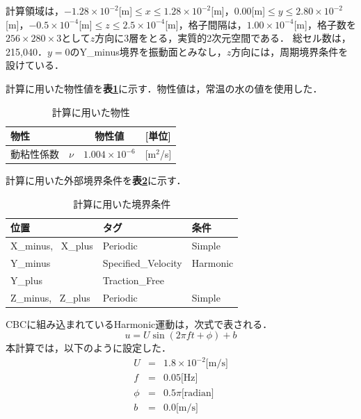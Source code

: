 計算領域は，$-1.28\times 10^{-2}$[m]$\leq x \leq1.28\times 10^{-2}$[m]，$0.00$[m]$\leq y \leq2.80\times 10^{-2}$[m]，$-0.5\times 10^{-4}$[m]$\leq z \leq2.5\times 10^{-4}$[m]，格子間隔は，$1.00\times 10^{-4}$[m]，格子数を$256\times280\times3$として$z$方向に3層をとる，実質的2次元空間である．
総セル数は，215,040．$y=0$のY\_minus境界を振動面とみなし，$z$方向には，周期境界条件を設けている．

計算に用いた物性値を\textbf{表\ref{table:stokes_bussei}}に示す．物性値は，常温の水の値を使用した．

\begin{table}[htbp]
\begin{center}
\caption{計算に用いた物性}
\label{table:stokes_bussei}
\begin{tabular}{lccl}
\toprule
物性	&&物性値 &[単位]\\
\hline
動粘性係数& $\nu$&$1.004\times 10^{-6}$ & [m$^2$/s] \\
\bottomrule
\end{tabular}
\end{center}
\end{table}

計算に用いた外部境界条件を\textbf{表\ref{table:stokes bci}}に示す．

\begin{table}[hdpt]
\caption{計算に用いた境界条件}
\label{table:stokes bci}
\begin{center}
\begin{tabular}{lll}
\toprule
位置&タグ	&条件 	\\
\hline
 X\_minus, \, X\_plus&Periodic & Simple \\
 Y\_minus&Specified\_Velocity & Harmonic \\
 Y\_plus&Traction\_Free &\\
Z\_minus, \, Z\_plus& Periodic & Simple \\
\bottomrule
\end{tabular}
\end{center}
\end{table}

CBCに組み込まれているHarmonic運動は，次式で表される．
\begin{equation}
u=U \sin(2\pi f t + \phi)+b
\end{equation}
本計算では，以下のように設定した．
\begin{eqnarray}
U & = & 1.8\times 10^{-2} \mbox{[m/s]}\nonumber\\
f & = & 0.05\mbox{[Hz]}\nonumber\\
\phi & = & 0.5 \pi\mbox{[radian]}\nonumber\\
b & = & 0.0\mbox{[m/s]}
\end{eqnarray}  

